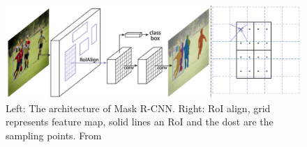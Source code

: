  \begin{figure}
     \centering
     \includegraphics[width=\textwidth]{img/maskrcnn}
     \caption[Mask R-CNN architecture and RoI alignment layer]%
     {Left: The architecture of Mask R-CNN. Right: RoI align, grid represents feature map, solid lines an RoI and the dost are the sampling points. From \cite[fig. 1, 3]{bib:maskrcnn}}
     \label{fig:maskrcnn}
 \end{figure}

